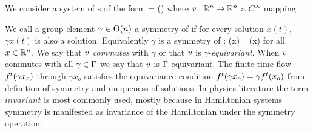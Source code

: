 
We consider a system of \ode s of the form
\beq
	\dot{\ssp} = \vf(\ssp)
	\label{eq:difeq}
\eeq
where $v: \mathbb{R}^{n} \rightarrow \mathbb{R}^{n}$ a $C^\infty$ mapping.

We call a group element $\gamma\in\mathrm{O}(n)$ a symmetry of
 if for every solution $x(t)$, $\gamma x(t)$
is also a solution. Equivalently $\gamma$ is a symmetry of :
\beq
	\vf(\gamma x) =\gamma \vf(x)
	\label{eq:equiv}
\eeq
for all $x\in\mathbb{R}^{n}$. We say that $v$ \emph{commutes} with
$\gamma$ or that $v$ is $\gamma$-\emph{equivariant}. When
$v$ commutes with all $\gamma\in\Gamma$ we say that $v$
is $\Gamma$-equivariant. The finite time flow
${f^{t}(\gamma x_o)}$ through $\gamma x_o$ satisfies the
equivariance condition ${f^{t}(\gamma x_o)}=\gamma
{f^{t}(x_o)}$ from definition of symmetry and uniqueness of
solutions. In physics literature the term $invariant$ is most
commonly used, mostly because in Hamiltonian systems symmetry
is manifested as invariance of the Hamiltonian under the
symmetry operation.



